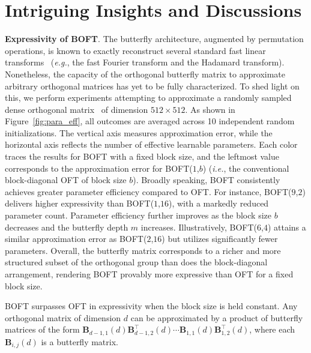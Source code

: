 \section{Intriguing Insights and Discussions}

\textbf{Expressivity of BOFT}. The butterfly architecture, augmented by permutation operations, is known to exactly reconstruct several standard fast linear transforms~\cite{dao2019learning,dao2019kaleidoscope} (\emph{e.g.}, the fast Fourier transform and the Hadamard transform). Nonetheless, the capacity of the orthogonal butterfly matrix to approximate arbitrary orthogonal matrices has yet to be fully characterized. To shed light on this, we perform experiments attempting to approximate a randomly sampled dense orthogonal matrix~\cite{anderson1987generation} of dimension $512\times 512$. As shown in Figure~\ref{fig:para_eff}, all outcomes are averaged across 10 independent random initializations. The vertical axis measures approximation error, while the horizontal axis reflects the number of effective learnable parameters. Each color traces the results for BOFT with a fixed block size, and the leftmost value corresponds to the approximation error for BOFT($1$,$b$) (\emph{i.e.}, the conventional block-diagonal OFT of block size $b$). Broadly speaking, BOFT consistently achieves greater parameter efficiency compared to OFT. For instance, BOFT($9$,$2$) delivers higher expressivity than BOFT($1$,$16$), with a markedly reduced parameter count. Parameter efficiency further improves as the block size $b$ decreases and the butterfly depth $m$ increases. Illustratively, BOFT($6$,$4$) attains a similar approximation error as BOFT($2$,$16$) but utilizes significantly fewer parameters. Overall, the butterfly matrix corresponds to a richer and more structured subset of the orthogonal group than does the block-diagonal arrangement, rendering BOFT provably more expressive than OFT for a fixed block size.

\begin{theorem}\label{thm:exp_boft}
    BOFT surpasses OFT in expressivity when the block size is held constant. Any orthogonal matrix of dimension $d$ can be approximated by a product of butterfly matrices of the form $\bm{B}_{d-1,1}(d)\bm{B}^\top_{d-1,2}(d)\cdots\bm{B}_{1,1}(d)\bm{B}^\top_{1,2}(d)$, where each $\bm{B}_{i,j}(d)$ is a butterfly matrix.
\end{theorem}

